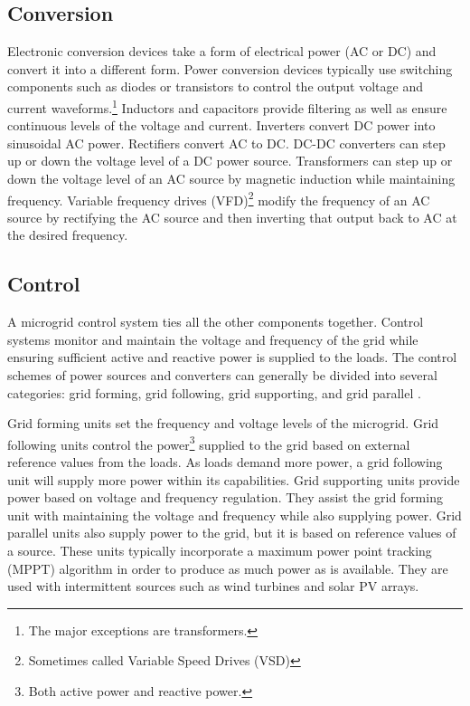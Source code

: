 \subsection{Conversion}
Electronic conversion devices take a form of electrical power (AC or DC) and convert it into a different form. Power conversion devices typically use switching components such as diodes or transistors to control the output voltage and current waveforms.\footnote{The major exceptions are transformers.} Inductors and capacitors provide filtering as well as ensure continuous levels of the voltage and current. Inverters convert DC power into sinusoidal AC power. Rectifiers convert AC to DC. DC-DC converters can step up or down the voltage level of a DC power source. Transformers can step up or down the voltage level of an AC source by magnetic induction while maintaining frequency. Variable frequency drives (VFD)\footnote{Sometimes called Variable Speed Drives (VSD)} modify the frequency of an AC source by rectifying the AC source and then inverting that output back to AC at the desired frequency. 




\subsection{Control}
A microgrid control system ties all the other components together. Control systems monitor and maintain the voltage and frequency of the grid while ensuring sufficient active and reactive power is supplied to the loads. The control schemes of power sources and converters can generally be divided into several categories: grid forming, grid following, grid supporting, and grid parallel \cite{Ortjohann2012, Engler, Strauss2003}. 

Grid forming units set the frequency and voltage levels of the microgrid. Grid following units control the power\footnote{Both active power and reactive power.} supplied to the grid based on external reference values from the loads. As loads demand more power, a grid following unit will supply more power within its capabilities. Grid supporting units provide power based on voltage and frequency regulation. They assist the grid forming unit with maintaining the voltage and frequency while also supplying power. Grid parallel units also supply power to the grid, but it is based on reference values of a source. These units typically incorporate a maximum power point tracking (MPPT) algorithm in order to produce as much power as is available. They are used with intermittent sources such as wind turbines and solar PV arrays. 

